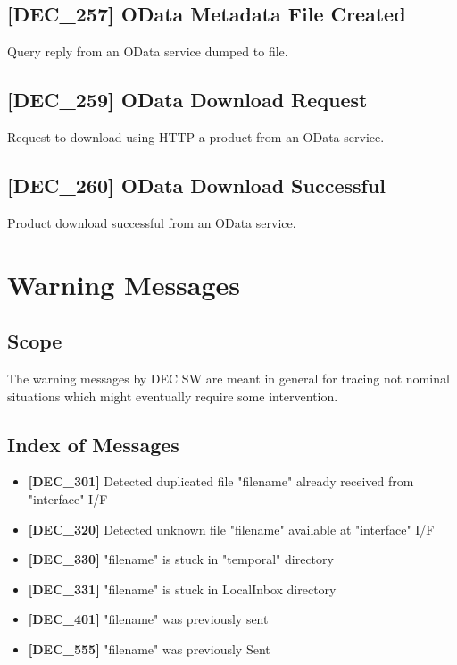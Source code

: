 \documentclass[dec_sum_main.tex]{subfiles}
\begin{document}
\label{DEC257}
\subsection{[DEC\_257] OData Metadata File  Created}
Query reply from an OData service dumped to file.

\label{DEC259}
\subsection{[DEC\_259] OData Download Request}
Request to download using HTTP a product from an OData service.

\label{DEC260}
\subsection{[DEC\_260] OData Download Successful}
Product download successful from an OData service.


\newpage

\section{Warning Messages}

\subsection{Scope}
The warning messages by DEC SW are meant in general for tracing not nominal situations which might eventually require some intervention.

\subsection{Index of Messages}

\begin{itemize}
	\item \textbf{[DEC\_301]} Detected duplicated file "filename" already received from "interface" I/F
	\item \textbf{[DEC\_320]} Detected unknown file "filename" available at "interface" I/F
	\item \textbf{[DEC\_330]} "filename" is stuck in "temporal" directory
	\item \textbf{[DEC\_331]} "filename" is stuck in LocalInbox directory
	\item \textbf{[DEC\_401]} "filename" was previously sent
	\item \textbf{[DEC\_555]} "filename" was previously Sent
\end{itemize}
\end{document}
